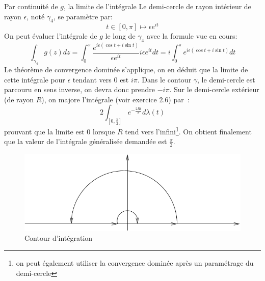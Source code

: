 \documentclass[a4paper, 12pt]{amsart}
\begin{document}
Par continuité
de $g$, la  limite de l'intégrale
Le demi-cercle de rayon intérieur de rayon $\epsilon$, noté $\gamma_4$, se paramètre par:
\[
t \in [0,\pi] \mapsto \epsilon e^{it}
\]
On peut évaluer l'intégrale de $g$ le long de $\gamma_4$ avec la formule vue en cours:
\[
\int_{\gamma_4}^{} g(z) dz = \int_0^\pi \frac{e^{i\epsilon(\cos t + i \sin t)}}{\epsilon e^{it}}i \epsilon e^{it}dt = i \int_0^\pi e^{i\epsilon(\cos t + i \sin t)} dt
\]
Le théorème de convergence dominée s'applique, on en déduit que la limite de cette intégrale pour $\epsilon$ tendant vers 0 est $i \pi$. Dans le contour $\gamma$, le demi-cercle est parcouru en sens inverse, on devra donc prendre $-i \pi$. 
Sur le
demi-cercle extérieur (de rayon $R$), on majore l'intégrale (voir exercice 2.6) par~:
\[
2 \int_{[0, \frac{\pi}{2}]} e^{- \frac{2 R t}{\pi}} d\lambda(t)
\]
prouvant que la limite est $0$ lorsque $R$ tend vers l'infini\footnote{on peut également utiliser la convergence dominée après un 
paramétrage du demi-cercle}.
 On obtient finalement que la valeur de
l'intégrale généralisée demandée est $\frac{\pi}{2}$.
\begin{figure}[ht]
\includegraphics[scale=1]{contour_sinc.pdf}
\caption{Contour d'intégration}\label{fig:contour_sinc}
\end{figure}
\end{document}
